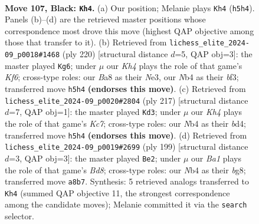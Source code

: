 \documentclass[11pt]{article}
\begin{document}
\clearpage

\begin{figure}[p]\centering
\begin{subfigure}{0.46\textwidth}\centering
\resizebox{\linewidth}{!}{%
\newchessgame
\chessboard[
  setfen={b7/8/8/7k/1n6/8/1B3P2/6K1 b - - 60 107},
  showmover=false,
  pgfstyle=straightmove, color=movearrow, markmove={h5-h4}
]}
\caption{}
\end{subfigure}\hfill
\begin{subfigure}{0.46\textwidth}\centering
\resizebox{\linewidth}{!}{%
\newchessgame
\chessboard[
  setfen={8/8/5K2/8/8/4Nbpk/8/8 w - - 48 111},
  showmover=false,
  pgfstyle=straightmove, color=movearrow, markmove={f6-g6}
]}
\caption{}
\end{subfigure}
\\[4pt]
\begin{subfigure}{0.46\textwidth}\centering
\resizebox{\linewidth}{!}{%
\newchessgame
\chessboard[
  setfen={8/5b2/5P2/8/1K1B4/8/2k5/8 b - - 32 109},
  showmover=false,
  pgfstyle=straightmove, color=movearrow, markmove={c2-d3}
]}
\caption{}
\end{subfigure}\hfill
\begin{subfigure}{0.46\textwidth}\centering
\resizebox{\linewidth}{!}{%
\newchessgame
\chessboard[
  setfen={6B1/8/8/8/3k4/P7/1K6/3b4 b - - 22 100},
  showmover=false,
  pgfstyle=straightmove, color=movearrow, markmove={d1-e2}
]}
\caption{}
\end{subfigure}
\caption{\textbf{Move 107, Black: \texttt{Kh4}.} (a) Our position; Melanie plays \texttt{Kh4} (\texttt{h5h4}). Panels (b)--(d) are the retrieved master positions whose correspondence most drove this move (highest QAP objective among those that transfer to it). (b) Retrieved from \texttt{lichess\_elite\_2024-09\_p0018\#1468} (ply 220) [structural distance $d$=5, QAP obj=3]: the master played \texttt{Kg6}; under $\mu$ our \emph{Kh4} plays the role of that game's \emph{Kf6}; cross-type roles: our \emph{B}a8 as their \emph{N}e3, our \emph{N}b4 as their \emph{b}f3; transferred move \texttt{h5h4} \textbf{(endorses this move)}. (c) Retrieved from \texttt{lichess\_elite\_2024-09\_p0020\#2804} (ply 217) [structural distance $d$=7, QAP obj=1]: the master played \texttt{Kd3}; under $\mu$ our \emph{Kh4} plays the role of that game's \emph{Kc7}; cross-type roles: our \emph{N}b4 as their \emph{b}d4; transferred move \texttt{h5h4} \textbf{(endorses this move)}. (d) Retrieved from \texttt{lichess\_elite\_2024-09\_p0019\#2699} (ply 199) [structural distance $d$=3, QAP obj=3]: the master played \texttt{Be2}; under $\mu$ our \emph{Ba1} plays the role of that game's \emph{Bd8}; cross-type roles: our \emph{N}b4 as their \emph{b}g8; transferred move \texttt{a8b7}. Synthesis: 5 retrieved analogs transferred to \texttt{Kh4} (summed QAP objective 11, the strongest correspondence among the candidate moves); Melanie committed it via the \texttt{search} selector.}
\label{fig:thought-m213}
\end{figure}
\end{document}

